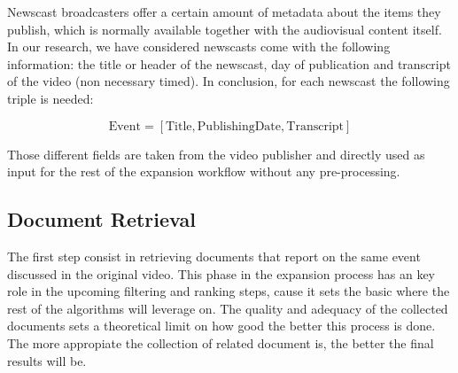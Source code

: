 \documentclass{llncs}
\begin{document}

Newscast broadcasters offer a certain amount of metadata about the items they publish, which is normally available together with the audiovisual content itself. In our research, we have considered newscasts come with the following information: the title or header of the newscast, day of publication and transcript of the video (non necessary timed). In conclusion, for each newscast the following triple is needed:

\begin{equation}
\text{Event} =\left [ \text{Title}, \text{PublishingDate}, \text{Transcript} \right ]
\end{equation}

Those different fields are taken from the video publisher and directly used as input for the rest of the expansion workflow without any pre-processing.

\subsection{Document Retrieval}

The first step consist in retrieving documents that report on the same event discussed in the original video. This phase in the expansion process has an key role in the upcoming filtering and ranking steps, cause it sets the basic where the rest of the algorithms will leverage on. The quality and adequacy of the collected documents sets a theoretical limit on how good the better this process is done. The more appropiate the collection of related document is, the better the final results will be.
\end{document}
